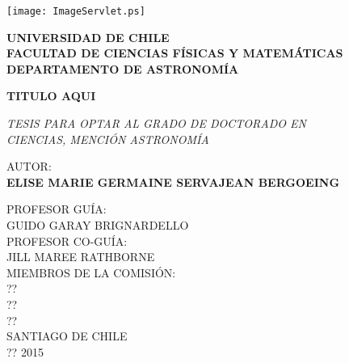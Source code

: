 \documentclass[phd, titlesmallcaps, copyrightpage]{mqthesis}
\numberwithin{equation}{chapter}
\begin{document}
\vspace*{-18 ex}
\thispagestyle{empty}
\begin{minipage}[b]{0.1\linewidth}
\texttt{[image: ImageServlet.ps]}%
\end{minipage}
\begin{minipage}[b]{0.9\linewidth}
{\bf \large \noindent UNIVERSIDAD DE CHILE \\
   FACULTAD DE CIENCIAS F\'ISICAS Y MATEM\'ATICAS \\
 DEPARTAMENTO  DE ASTRONOM\'IA }
\end{minipage}
\hfill
\vspace{4cm}

\begin{center}{\bf \Large TITULO AQUI}\end{center}

\vspace{1 ex} 

\begin{center}{\it  \large TESIS PARA OPTAR AL GRADO DE DOCTORADO EN \\
CIENCIAS, MENCI\'ON ASTRONOM\'IA} \end{center}

\vspace{1.5cm} 


\begin{center} {\large AUTOR: \\ {\bf ELISE MARIE GERMAINE SERVAJEAN BERGOEING}} \end{center}

\vspace{7 ex} 

\begin{center} { PROFESOR GU\'IA:\\
    GUIDO GARAY BRIGNARDELLO\\
    PROFESOR CO-GU\'IA:\\
    JILL MAREE RATHBORNE\\
    \vspace{0.3cm}
    MIEMBROS DE LA COMISI\'ON:\\
    ??\\
    ??\\
    ??\\
    \vspace{0.8cm}
    SANTIAGO DE CHILE\\
    ?? 2015 } \end{center}
\end{document}

